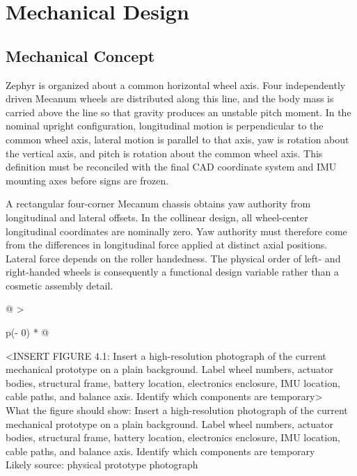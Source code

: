 \chapter{Mechanical Design}\label{ch:mechanical-design}

\section{Mechanical Concept}\label{mechanical-concept}

Zephyr is organized about a common horizontal wheel axis. Four
independently driven Mecanum wheels are distributed along this line, and
the body mass is carried above the line so that gravity produces an
unstable pitch moment. In the nominal upright configuration,
longitudinal motion is perpendicular to the common wheel axis, lateral
motion is parallel to that axis, yaw is rotation about the vertical
axis, and pitch is rotation about the common wheel axis. This definition
must be reconciled with the final CAD coordinate system and IMU mounting
axes before signs are frozen.

A rectangular four-corner Mecanum chassis obtains yaw authority from
longitudinal and lateral offsets. In the collinear design, all
wheel-center longitudinal coordinates are nominally zero. Yaw authority
must therefore come from the differences in longitudinal force applied
at distinct axial positions. Lateral force depends on the roller
handedness. The physical order of left- and right-handed wheels is
consequently a functional design variable rather than a cosmetic
assembly detail.

\begin{longtable}[]{@{}
  >{\raggedright\arraybackslash}p{(\columnwidth - 0\tabcolsep) * }@{}}
\toprule\noalign{}
\begin{minipage}[b]{\linewidth}\raggedright
\textless INSERT FIGURE 4.1: Insert a high-resolution photograph of the
current mechanical prototype on a plain background. Label wheel numbers,
actuator bodies, structural frame, battery location, electronics
enclosure, IMU location, cable paths, and balance axis. Identify which
components are temporary\textgreater{}\\
What the figure should show: Insert a high-resolution photograph of the
current mechanical prototype on a plain background. Label wheel numbers,
actuator bodies, structural frame, battery location, electronics
enclosure, IMU location, cable paths, and balance axis. Identify which
components are temporary\\
Likely source: physical prototype photograph\strut
\end{minipage} \\
\midrule\noalign{}
\endhead
\bottomrule\noalign{}
\endlastfoot
\end{longtable}

